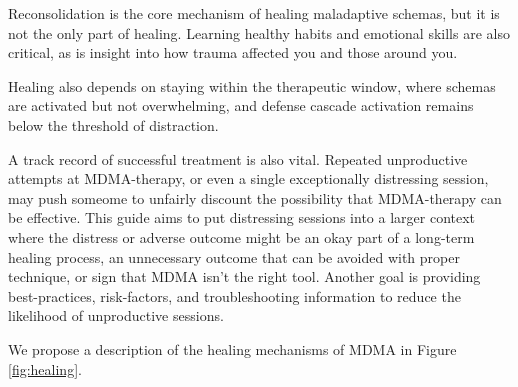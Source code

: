 \documentclass[12pt,letterpaper]{article}
\begin{document}
\vspace{\baselineskip}

Reconsolidation is the core mechanism of healing maladaptive schemas, but it is not the only part of healing. Learning healthy habits and emotional skills are also critical, as is insight into how trauma affected you and those around you.

Healing also depends on staying within the therapeutic window, where schemas are activated but not overwhelming, and defense cascade activation remains below the threshold of distraction.

A track record of successful treatment is also vital. Repeated unproductive attempts at MDMA-therapy, or even a single exceptionally distressing session, may push someome to unfairly discount the possibility that MDMA-therapy can be effective. This guide aims to put distressing sessions into a larger context where the distress or adverse outcome might be an okay part of a long-term healing process, an unnecessary outcome that can be avoided with proper technique, or sign that MDMA isn't the right tool. Another goal is providing best-practices, risk-factors, and troubleshooting information to reduce the likelihood of unproductive sessions.

We propose a description of the healing mechanisms of MDMA in Figure \ref{fig:healing}.
\end{document}
